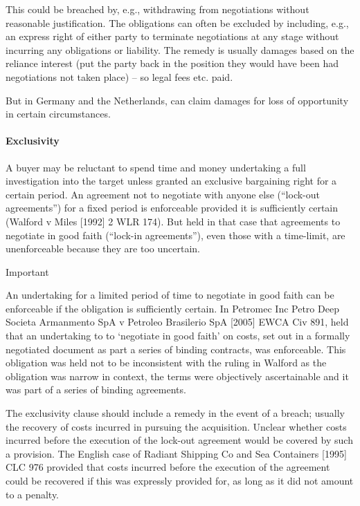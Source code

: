 \documentclass[
]{article}
\newenvironment{env-d2bd2e68-cd24-4923-bb6f-ad1027a637df}
{
    \savenotes\tcolorbox[blanker,breakable,left=5pt,borderline west={2pt}{-4pt}{cyan}]
}
{
    \endtcolorbox\spewnotes
}
\begin{document}
This could be breached by, e.g., withdrawing from negotiations without
reasonable justification. The obligations can often be excluded by
including, e.g., an express right of either party to terminate
negotiations at any stage without incurring any obligations or
liability. The remedy is usually damages based on the reliance interest
(put the party back in the position they would have been had
negotiations not taken place) -- so legal fees etc. paid.

But in Germany and the Netherlands, can claim damages for loss of
opportunity in certain circumstances.

\hypertarget{exclusivity}{%
\paragraph{Exclusivity}\label{exclusivity}}

A buyer may be reluctant to spend time and money undertaking a full
investigation into the target unless granted an exclusive bargaining
right for a certain period. An agreement not to negotiate with anyone
else (``lock-out agreements'') for a fixed period is enforceable
provided it is sufficiently certain (Walford v Miles {[}1992{]} 2 WLR
174). But held in that case that agreements to negotiate in good faith
(``lock-in agreements''), even those with a time-limit, are
unenforceable because they are too uncertain.

\begin{env-d2bd2e68-cd24-4923-bb6f-ad1027a637df}

Important

An undertaking for a limited period of time to negotiate in good faith
can be enforceable if the obligation is sufficiently certain. In
Petromec Inc Petro Deep Societa Armanmento SpA v Petroleo Brasilerio SpA
{[}2005{]} EWCA Civ 891, held that an undertaking to to `negotiate in
good faith' on costs, set out in a formally negotiated document as part
a series of binding contracts, was enforceable. This obligation was held
not to be inconsistent with the ruling in Walford as the obligation was
narrow in context, the terms were objectively ascertainable and it was
part of a series of binding agreements.

\end{env-d2bd2e68-cd24-4923-bb6f-ad1027a637df}

The exclusivity clause should include a remedy in the event of a breach;
usually the recovery of costs incurred in pursuing the acquisition.
Unclear whether costs incurred before the execution of the lock-out
agreement would be covered by such a provision. The English case of
Radiant Shipping Co and Sea Containers {[}1995{]} CLC 976 provided that
costs incurred before the execution of the agreement could be recovered
if this was expressly provided for, as long as it did not amount to a
penalty.
\end{document}
